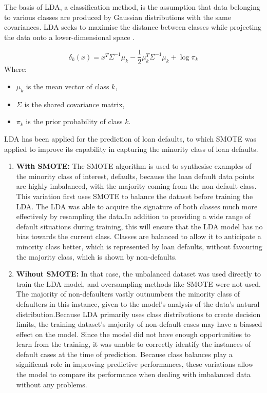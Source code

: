 \documentclass[12pt, a4paper,oneside]{book}
\numberwithin{equation}{section}
\begin{document}
The basis of LDA, a classification method, is the assumption that data belonging to various classes are produced by Gaussian distributions with the same covariances. LDA seeks to maximise the distance between classes while projecting the data onto a lower-dimensional space \cite{boehmke2019hands}.

\[\delta_k(x) = x^T \Sigma^{-1} \mu_k - \frac{1}{2} \mu_k^T \Sigma^{-1} \mu_k + \log \pi_k\]
Where:
\begin{itemize}
    \item $\mu_k$ is the mean vector of class $k$,
    \item $\Sigma$ is the shared covariance matrix,
    \item $\pi_k$ is the prior probability of class $k$.
\end{itemize}

LDA has been applied for the prediction of loan defaults, to which SMOTE was applied to improve its capability in capturing the minority class of loan defaults.
\begin{enumerate}
    \item \textbf{With SMOTE:} \newline
    The SMOTE algorithm is used to synthesise examples of the minority class of interest, defaults, because the loan default data points are highly imbalanced, with the majority coming from the non-default class. This variation first uses SMOTE to balance the dataset before training the LDA. The LDA was able to acquire the signature of both classes much more effectively by resampling the data.In addition to providing a wide range of default situations during training, this will ensure that the LDA model has no bias towards the current class. Classes are balanced to allow it to anticipate a minority class better, which is represented by loan defaults, without favouring the majority class, which is shown by non-defaults.

  \item\textbf{Wihout SMOTE:} \newline
   In that case, the unbalanced dataset was used directly to train the LDA model, and oversampling methods like SMOTE were not used. The majority of non-defaulters vastly outnumbers the minority class of defaulters in this instance, given to the model's analysis of the data's natural distribution.Because LDA primarily uses class distributions to create decision limits, the training dataset's majority of non-default cases may have a biassed effect on the model. Since the model did not have enough opportunities to learn from the training, it was unable to correctly identify the instances of default cases at the time of prediction. Because class balances play a significant role in improving predictive performances, these variations allow the model to compare its performance when dealing with imbalanced data without any problems.
\end{enumerate}
\end{document}
